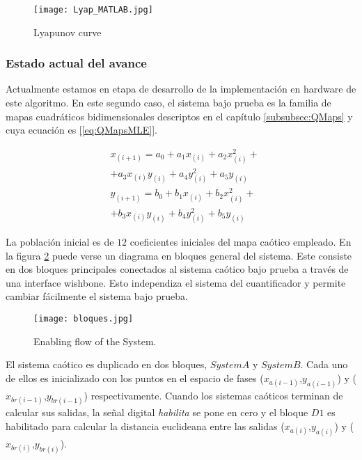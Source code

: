 \begin{figure}
	\centering
	\texttt{[image: Lyap\_MATLAB.jpg]}\\
	\caption{Lyapunov curve}\label{lyapu}
\end{figure}


\subsubsection{Estado actual del avance}

Actualmente estamos en etapa de desarrollo de la implementación en hardware de este algoritmo.
En este segundo caso, el sistema bajo prueba es la familia de mapas cuadráticos bidimensionales descriptos en el capítulo \ref{subsubsec:QMaps} y cuya ecuación es \ref{[eq:QMapsMLE]}.

\begin{eqnarray}\label{eq:QMapsMLE}
&x_{(i+1)}=a_0 + a_1 x_{(i)} + a_2 x_{(i)}^2 +\\ \nonumber
&+ a_3 x_{(i)} y_{(i)} + a_4 y_{(i)}^2 + a_5 y_{(i)}\\ \nonumber
&y_{(i+1)}=b_0 + b_1 x_{(i)} + b_2 x_{(i)}^2 +\\ \nonumber
&+ b_3 x_{(i)} y_{(i)} + b_4 y_{(i)}^2 + b_5 y_{(i)}\nonumber
\end{eqnarray}

La población inicial es de $12$ coeficientes iniciales del mapa caótico empleado.
En la figura \ref{bloques} puede verse un diagrama en bloques general del sistema.
Este consiste en dos bloques principales conectados al sistema caótico bajo prueba a través de una interface wishbone.
Esto independiza el sistema del cuantificador y permite cambiar fácilmente el sistema bajo prueba.

\begin{figure}
	\centering
	\texttt{[image: bloques.jpg]}\\
	\caption{Enabling flow of the System.}\label{bloques}
\end{figure}

El sistema caótico es duplicado en dos bloques, $System A$ y $System B$.
Cada uno de ellos es inicializado con los puntos en el espacio de fases	($x_{a(i-1)}$,$y_{a(i-1)}$) y ($x_{br(i-1)}$,$y_{br(i-1)}$) respectivamente.
Cuando los sistemas caóticos terminan de calcular sus salidas, la señal digital \textit{habilita} se pone en cero y el bloque $D1$ es habilitado para calcular la distancia euclideana entre las salidas ($x_{a(i)}$,$y_{a(i)}$) y ($x_{br(i)}$,$y_{br(i)}$).

